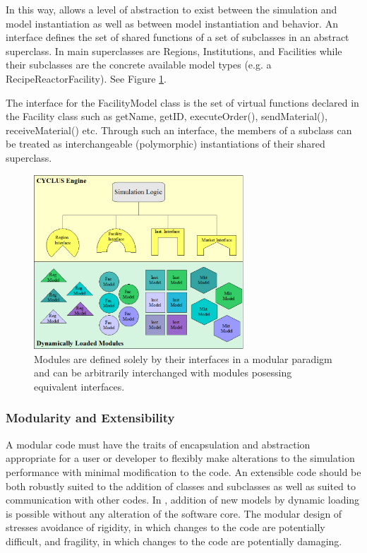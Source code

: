 In this way, \Cyclus allows a level of abstraction to exist between 
the simulation and model instantiation as well as between model 
instantiation and behavior.  An interface defines the set of shared 
functions of a set of subclasses in an abstract superclass. In \Cyclus
main superclasses are Regions, Institutions, and Facilities 
while their subclasses are the concrete available model types (e.g. a 
RecipeReactorFacility). See Figure \ref{fig:modularity}.

The interface for the FacilityModel class is the set of 
virtual functions declared in the Facility class such as getName, 
getID, executeOrder(), sendMaterial(), receiveMaterial() etc.  Through 
such an interface, the members of a subclass can be treated as 
interchangeable (polymorphic) instantiations of their shared 
superclass. 

\begin{figure}[htb!]
  \begin{center}
    \includegraphics[width=0.7\textwidth]{./chapters/paradigm/modularity.png}
  \end{center}
  \caption[Module Interfaces and Encapsulation]{Modules are defined solely 
  by their interfaces in a modular paradigm and can be arbitrarily 
  interchanged with modules posessing equivalent interfaces.}
  \label{fig:modularity}
\end{figure}


\subsubsection{Modularity and Extensibility}

A modular code must have the traits of encapsulation and abstraction 
appropriate for a user or developer to flexibly make alterations to 
the simulation performance with minimal modification to the code. An 
extensible code should be both robustly suited to the addition of 
classes and subclasses as well as suited to communication with other codes.
In \Cyclus, addition of new models by dynamic loading is possible without 
any alteration of the software core. The modular design of \Cyclus stresses
avoidance of rigidity, in which changes to the code are potentially difficult, 
and fragility, in which changes to the code are potentially damaging.

